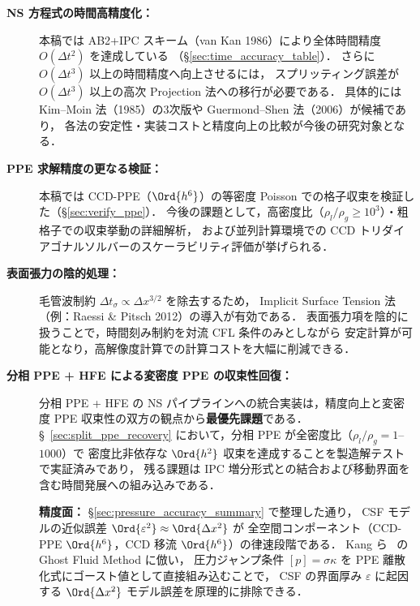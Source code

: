 \begin{description}
  \item[\textbf{NS 方程式の時間高精度化：}]
        本稿では AB2+IPC スキーム（van Kan 1986）により全体時間精度 $O(\Delta t^2)$ を達成している
        （§\ref{sec:time_accuracy_table}）．
        さらに $O(\Delta t^3)$ 以上の時間精度へ向上させるには，
        スプリッティング誤差が $O(\Delta t^3)$ 以上の高次 Projection 法への移行が必要である．
        具体的には Kim--Moin 法（1985）の3次版や Guermond--Shen 法（2006）が候補であり，
        各法の安定性・実装コストと精度向上の比較が今後の研究対象となる．

  \item[\textbf{PPE 求解精度の更なる検証：}]
        本稿では CCD-PPE（$\Ord{h^6}$）の等密度 Poisson での格子収束を検証した（§\ref{sec:verify_ppe}）．
        今後の課題として，高密度比（$\rho_l/\rho_g \geq 10^3$）・粗格子での収束挙動の詳細解析，
        および並列計算環境での CCD トリダイアゴナルソルバーのスケーラビリティ評価が挙げられる．

  \item[\textbf{表面張力の陰的処理：}]
        毛管波制約 $\Delta t_\sigma \propto \Delta x^{3/2}$ を除去するため，
        Implicit Surface Tension 法（例：Raessi \& Pitsch 2012）の導入が有効である．
        表面張力項を陰的に扱うことで，時間刻み制約を対流 CFL 条件のみとしながら
        安定計算が可能となり，高解像度計算での計算コストを大幅に削減できる．

  \item[\textbf{分相 PPE + HFE による変密度 PPE の収束性回復：}]
        分相 PPE + HFE の NS パイプラインへの統合実装は，精度向上と変密度 PPE 収束性の双方の観点から\textbf{最優先課題}である．
        §~\ref{sec:split_ppe_recovery} において，分相 PPE が全密度比（$\rho_l/\rho_g = 1$--$1000$）で
        密度比非依存な $\Ord{h^2}$ 収束を達成することを製造解テストで実証済みであり，
        残る課題は IPC 増分形式との結合および移動界面を含む時間発展への組み込みである．

        \textbf{精度面：}
        §\ref{sec:pressure_accuracy_summary} で整理した通り，
        CSF モデルの近似誤差 $\Ord{\varepsilon^2} \approx \Ord{\Delta x^2}$ が
        全空間コンポーネント（CCD-PPE $\Ord{h^6}$，CCD 移流 $\Ord{h^6}$）の律速段階である．
        Kang ら~\cite{Kang2000} の Ghost Fluid Method に倣い，
        圧力ジャンプ条件 $[p] = \sigma\kappa$ を PPE 離散化式にゴースト値として直接組み込むことで，
        CSF の界面厚み $\varepsilon$ に起因する $\Ord{\Delta x^2}$ モデル誤差を原理的に排除できる．


\end{description}
